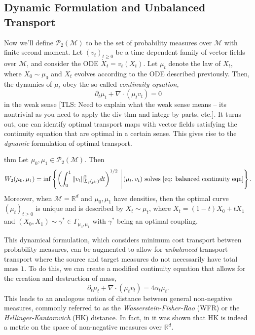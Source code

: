 \documentclass[11pt]{article}
\newcommand{\man}{\mathcal{M}}
\newcommand{\tls}[1]{{\color{cyan}[TLS: #1]}}
\begin{document}
\subsection{Dynamic Formulation and Unbalanced Transport}

Now we'll define $\mathcal{P}_{2}(\man)$ to be the set of probability measures over $\man$ with finite second moment. Let $(v_t)_{t \geq 0}$ be a time dependent family of vector fields over $\man$, and consider the ODE $\dot X_t = v_t(X_t)$. Let $\mu_t$ denote the law of $X_t$, where $X_0 \sim \mu_0$ and $X_t$ evolves according to the ODE described previously. Then, the dynamics of $\mu_t$ obey the so-called \textit{continuity equation},
\begin{equation}
    \partial_t\mu_t + \nabla \cdot (\mu_t v_t) = 0 \label{eq: balanced continuity eqn}
\end{equation}
in the weak sense \tls{Need to explain what the weak sense means -- its nontrivial as you need to apply the div thm and integr by parts, etc.}. It turns out, one can identify optimal transport maps with vector fields satisfying the continuity equation that are optimal in a certain sense. This gives rise to the \textit{dynamic} formulation of optimal transport.

\begin{restatable}{thm}{}
    Let $\mu_0, \mu_1 \in \mathcal{P}_{2}(\man)$. Then 
    \begin{equation*}
        W_2(\mu_0, \mu_1) = \inf \left\{\left(\int_{0}^1\|v_t\|^2_{L_2(\mu_t)} dt\right)^{1/2} \, \Bigg| \, (\mu_t, v_t) \text{ solves \cref{eq: balanced continuity eqn}}\right\}.
    \end{equation*}
    Moreover, when $\man = \mathbb{R}^d$ and $\mu_0, \mu_1$ have densities, then the optimal curve $(\mu_t)_{t\geq 0}$ is unique and is described by $X_t \sim \mu_t$, where $X_t = (1-t)X_0 + tX_1$ and $(X_0, X_1) \sim \gamma^* \in \Gamma_{\mu_0, \mu_1}$ with $\gamma^*$ being an optimal coupling.
\end{restatable}

This dynamical formulation, which considers minimum cost transport between probability measures, can be augmented to allow for \textit{unbalanced} transport -- transport where the source and target measures do not necessarily have total mass $1$. To do this, we can create a modified continuity equation that allows for the creation and destruction of mass,
\begin{equation}
    \partial_t\mu_t + \nabla \cdot (\mu_tv_t) = 4\alpha_t\mu_t. \label{eq: unbalanced continuity eqn}
\end{equation}
This leads to an analogous notion of distance between general non-negative measures, commonly referred to as the \textit{Wasserstein-Fisher-Rao} (WFR) or the \textit{Hellinger-Kantorovich} (HK) distance. In fact, in \citet{liero2018optimal} it was shown that HK is indeed a metric on the space of non-negative measures over $\mathbb{R}^d$. 
\end{document}
